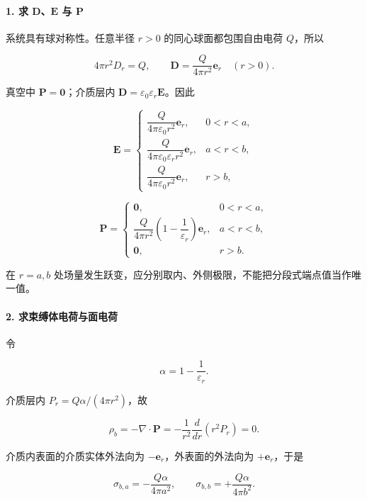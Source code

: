 \paragraph{\texorpdfstring{1. 求 \(\mathbf D\)、\(\mathbf E\) 与
\(\mathbf P\)}{1. 求 \textbackslash mathbf D、\textbackslash mathbf E 与 \textbackslash mathbf P}}\label{m3:ux6c42-mathbf-dmathbf-e-ux4e0e-mathbf-p}

系统具有球对称性。任意半径 \(r>0\) 的同心球面都包围自由电荷 \(Q\)，所以

\[
4\pi r^2D_r=Q,
\qquad
\boxed{\mathbf D=\frac{Q}{4\pi r^2}\mathbf e_r}\quad(r>0).
\]

真空中 \(\mathbf P=\mathbf0\)；介质层内
\(\mathbf D=\varepsilon_0\varepsilon_r\mathbf E\)。因此

\[
\boxed{
\mathbf E=\begin{cases}
\dfrac{Q}{4\pi\varepsilon_0r^2}\mathbf e_r,&0<r<a,\\[6pt]
\dfrac{Q}{4\pi\varepsilon_0\varepsilon_rr^2}\mathbf e_r,&a<r<b,\\[6pt]
\dfrac{Q}{4\pi\varepsilon_0r^2}\mathbf e_r,&r>b,
\end{cases}}
\]

\[
\boxed{
\mathbf P=\begin{cases}
\mathbf0,&0<r<a,\\[4pt]
\dfrac{Q}{4\pi r^2}\left(1-\dfrac1{\varepsilon_r}\right)\mathbf e_r,&a<r<b,\\[6pt]
\mathbf0,&r>b.
\end{cases}}
\]

在 \(r=a,b\)
处场量发生跃变，应分别取内、外侧极限，不能把分段式端点值当作唯一值。

\paragraph{2.
求束缚体电荷与面电荷}\label{m3:ux6c42ux675fux7f1aux4f53ux7535ux8377ux4e0eux9762ux7535ux8377}

令

\[
\alpha=1-\frac1{\varepsilon_r}.
\]

介质层内 \(P_r=Q\alpha/(4\pi r^2)\)，故

\[
\rho_b=-\nabla\cdot\mathbf P
=-\frac1{r^2}\frac{d}{dr}(r^2P_r)=0.
\]

介质内表面的介质实体外法向为 \(-\mathbf e_r\)，外表面的外法向为
\(+\mathbf e_r\)，于是

\[
\sigma_{b,a}=-\frac{Q\alpha}{4\pi a^2},
\qquad
\sigma_{b,b}=+\frac{Q\alpha}{4\pi b^2}.
\]

